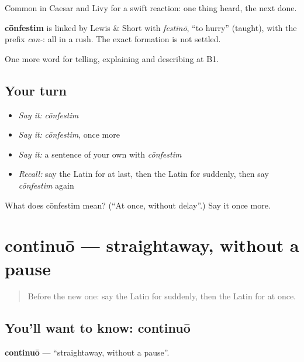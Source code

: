 Common in Caesar and Livy for a swift reaction: one thing heard, the next done.

\begin{cousinweb}
\textbf{cōnfestim} is linked by Lewis \& Short with \emph{festīnō}, \textquotedblleft{}to hurry\textquotedblright{} (taught), with the prefix \emph{con-}: all in a rush. The exact formation is not settled.
\end{cousinweb}

\begin{grammarlens}[title={What you've built}]
One more word for telling, explaining and describing at B1.
\end{grammarlens}

\subsection*{Your turn}
\begin{itemize}
\raggedright
  \item \emph{Say it:} \emph{cōnfestim}
  \item \emph{Say it:} \emph{cōnfestim}, once more
  \item \emph{Say it:} a sentence of your own with \emph{cōnfestim}
  \item \emph{Recall:} say the Latin for at last, then the Latin for suddenly, then say \emph{cōnfestim} again
\end{itemize}

\begin{tcolorbox}[breakable,colback=teal!4,colframe=teal!35!black,title={Before you move on}]
What does cōnfestim mean? (\textquotedblleft{}At once, without delay\textquotedblright{}.) Say it once more.
\end{tcolorbox}
\section[continuō]{continuō — straightaway, without a pause}

\label{lesson:LA-C292-continuo}



\begin{quote}
Before the new one: say the Latin for suddenly, then the Latin for at once.
\end{quote}

\subsection*{You'll want to know: continuō}
\textbf{continuō} — \textquotedblleft{}straightaway, without a pause\textquotedblright{}.

